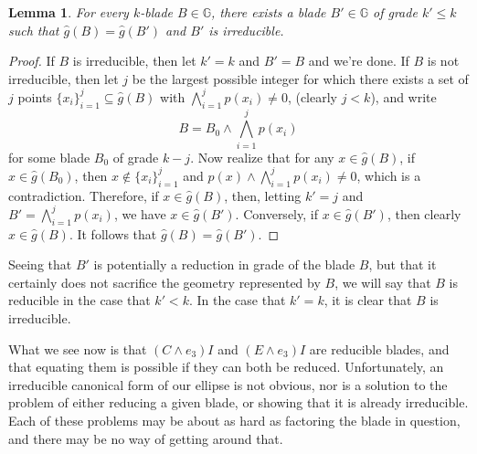 \documentclass{birkjour}
\newtheorem{lem}[thm]{Lemma}
\theoremstyle{definition}
\theoremstyle{remark}
\numberwithin{equation}{section}
\newcommand{\G}{\mathbb{G}}
\newcommand{\gh}{\hat{g}}
\begin{document}
\begin{lem}
For every $k$-blade $B\in\G$, there exists a blade $B'\in\G$ of grade $k'\leq k$
such that $\gh(B)=\gh(B')$ and $B'$ is irreducible.
\end{lem}
\begin{proof}
If $B$ is irreducible, then let $k'=k$ and $B'=B$ and we're done.
If $B$ is not irreducible, then let $j$ be the largest possible integer
for which there exists a set of $j$ points $\{x_i\}_{i=1}^j\subseteq\gh(B)$
with $\bigwedge_{i=1}^j p(x_i)\neq 0$, (clearly $j<k$), and write
\begin{equation*}
B = B_0\wedge\bigwedge_{i=1}^j p(x_i)
\end{equation*}
for some blade $B_0$ of grade $k-j$.  Now realize that for any $x\in\gh(B)$,
if $x\in\gh(B_0)$, then $x\not\in\{x_i\}_{i=1}^j$ and $p(x)\wedge\bigwedge_{i=1}^j p(x_i)\neq 0$,
which is a contradiction.  Therefore, if $x\in\gh(B)$, then, letting $k'=j$ and $B'=\bigwedge_{i=1}^jp(x_i)$,
we have $x\in\gh(B')$.  Conversely, if $x\in\gh(B')$, then clearly $x\in\gh(B)$.  It follows that
$\gh(B)=\gh(B')$.
\end{proof}

Seeing that $B'$ is potentially a reduction in grade of the blade $B$, but that it certainly does
not sacrifice the geometry represented by $B$, we will say that $B$ is reducible
in the case that $k'<k$.  In the case that $k'=k$, it is clear that $B$ is irreducible.

What we see now is that $(C\wedge e_3)I$ and $(E\wedge e_3)I$ are reducible blades,
and that equating them is possible if they can both be reduced.  Unfortunately,
an irreducible canonical form of our ellipse is not obvious, nor is a solution to the problem
of either reducing a given blade, or showing that it is already irreducible.  Each of these
problems may be about as hard as factoring the blade in question, and there may be no
way of getting around that.


\end{document}
